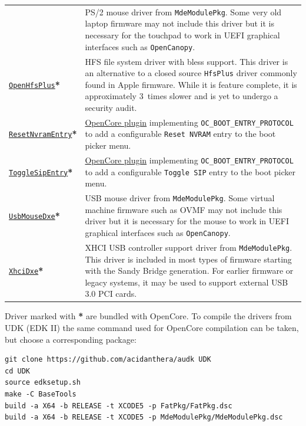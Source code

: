 \documentclass[]{article}
\begin{document}
\begin{longtable}{p{1.65in}p{5.25in}}
& PS/2 mouse driver from \texttt{MdeModulePkg}. Some very old laptop firmware
  may not include this driver but it is necessary for the touchpad to work
  in UEFI graphical interfaces such as \texttt{OpenCanopy}. \\
\href{https://github.com/acidanthera/OpenCorePkg}{\texttt{OpenHfsPlus}}\textbf{*}
& HFS file system driver with bless support. This driver is an alternative to
  a closed source \texttt{HfsPlus} driver commonly found in Apple firmware. While
  it is feature complete, it is approximately 3~times slower and is yet to undergo
  a security audit. \\
\href{https://github.com/acidanthera/OpenCorePkg}{\texttt{ResetNvramEntry}}\textbf{*}
& \hyperref[uefiresetnvram]{OpenCore plugin} implementing \texttt{OC\_BOOT\_ENTRY\_PROTOCOL}
  to add a configurable \texttt{Reset NVRAM} entry to the boot picker menu. \\
\href{https://github.com/acidanthera/OpenCorePkg}{\texttt{ToggleSipEntry}}\textbf{*}
& \hyperref[uefitogglesip]{OpenCore plugin} implementing \texttt{OC\_BOOT\_ENTRY\_PROTOCOL}
  to add a configurable \texttt{Toggle SIP} entry to the boot picker menu. \\
\href{https://github.com/acidanthera/audk}{\texttt{UsbMouseDxe}}\textbf{*}
& USB mouse driver from \texttt{MdeModulePkg}. Some virtual machine firmware
  such as OVMF may not include this driver but it is necessary for the mouse to work
  in UEFI graphical interfaces such as \texttt{OpenCanopy}. \\
\href{https://github.com/acidanthera/audk}{\texttt{XhciDxe}}\textbf{*}
& XHCI USB controller support driver from \texttt{MdeModulePkg}. This driver is
  included in most types of firmware starting with the Sandy Bridge generation. For earlier firmware
  or legacy systems, it may be used to support external USB 3.0 PCI cards.
\end{longtable}

Driver marked with \textbf{*} are bundled with OpenCore.
To compile the drivers from UDK (EDK II) the same command used for
OpenCore compilation can be taken, but choose a corresponding package:
\begin{lstlisting}[label=compileudk, style=ocbash]
git clone https://github.com/acidanthera/audk UDK
cd UDK
source edksetup.sh
make -C BaseTools
build -a X64 -b RELEASE -t XCODE5 -p FatPkg/FatPkg.dsc
build -a X64 -b RELEASE -t XCODE5 -p MdeModulePkg/MdeModulePkg.dsc
\end{lstlisting}
\end{document}
